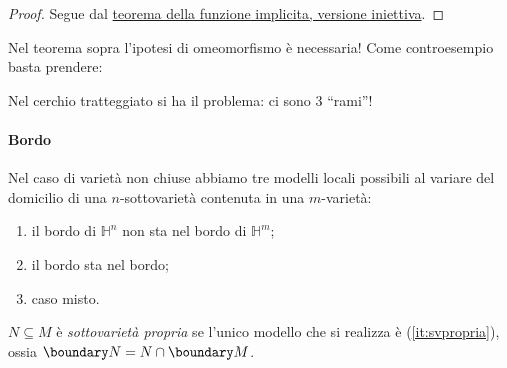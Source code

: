 \begin{proof}
	Segue dal \hyperref[th:funimpinj]{teorema della funzione implicita, versione iniettiva}.
\end{proof}

\begin{oss}
	Nel teorema sopra l'ipotesi di omeomorfismo è necessaria!
	Come controesempio basta prendere:
	\begin{center}
		
	\end{center}
	Nel cerchio tratteggiato si ha il problema: ci sono 3 ``rami''!
\end{oss}

\paragraph{Bordo}

Nel caso di varietà non chiuse
abbiamo tre modelli locali possibili
al variare del domicilio di una $n$-sottovarietà contenuta in una $m$-varietà:
\begin{enumerate}
 \item il bordo di $\mathbb H^n$ non sta nel bordo di $\mathbb H^m$;
 \item il bordo sta nel bordo;
	 \label{it:svpropria}
 \item caso misto.
\end{enumerate}
\begin{center}
	
\end{center}

\begin{defn}
	$N\subseteq M$ è \emph{sottovarietà propria}
	se l'unico modello che si realizza è (\ref{it:svpropria}),
	ossia $\boundary N = N\cap \boundary M$.
\end{defn}
